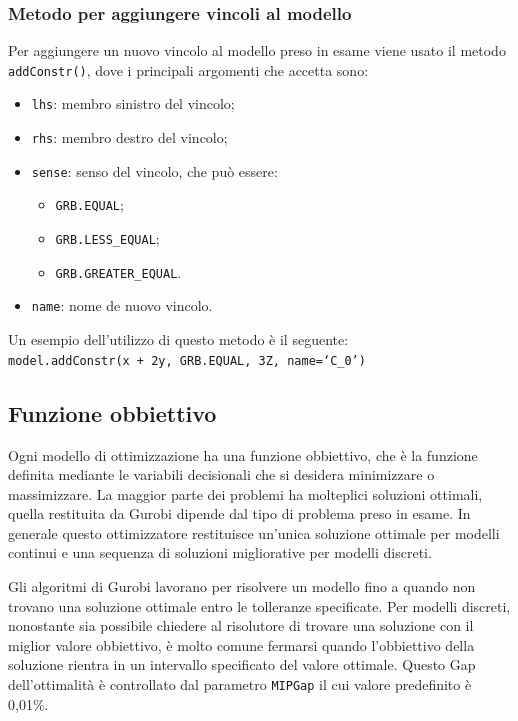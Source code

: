 \subsubsection*{Metodo per aggiungere vincoli al modello}
Per aggiungere un nuovo vincolo al modello preso in esame viene usato il metodo \texttt{addConstr()}, dove i principali argomenti che accetta sono:
\begin{itemize}
\item \texttt{lhs}: membro sinistro del vincolo;
\item \texttt{rhs}: membro destro del vincolo;
\item \texttt{sense}: senso del vincolo, che può essere:
\begin{itemize}
\item \texttt{GRB.EQUAL};
\item \texttt{GRB.LESS\_EQUAL};
\item \texttt{GRB.GREATER\_EQUAL}.
\end{itemize}
\item \texttt{name}: nome de nuovo vincolo.
\end{itemize}

Un esempio dell'utilizzo di questo metodo è il seguente:\\
\texttt{model.addConstr(x + 2y, GRB.EQUAL, 3Z, name=`C\_0')}

\subsection{Funzione obbiettivo}
Ogni modello di ottimizzazione ha una funzione obbiettivo, che è la funzione definita mediante le variabili decisionali che si desidera minimizzare o massimizzare.
La maggior parte dei problemi ha molteplici soluzioni ottimali, quella restituita da Gurobi dipende dal tipo di problema preso in esame.
In generale questo ottimizzatore restituisce un'unica soluzione ottimale per modelli continui e una sequenza di soluzioni migliorative per modelli discreti.

Gli algoritmi di Gurobi lavorano per risolvere un modello fino a quando non trovano una soluzione ottimale entro le tolleranze specificate.
Per modelli discreti, nonostante sia possibile chiedere al risolutore di trovare una soluzione con il miglior valore obbiettivo, è molto comune fermarsi quando l'obbiettivo della soluzione rientra in un intervallo specificato del valore ottimale.
Questo Gap dell'ottimalità è controllato dal parametro \texttt{MIPGap} il cui valore predefinito è 0,01\%.

